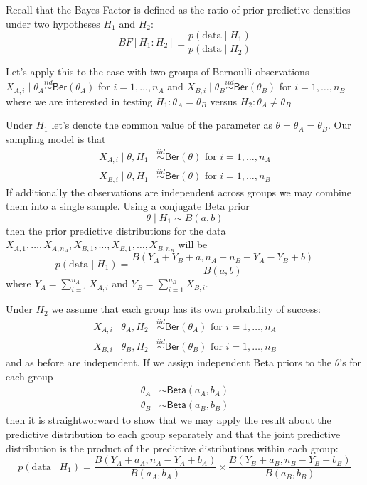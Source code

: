 \documentclass[11pt]{article}
\def\Ber{\textsf{Ber}}
\def\iid{\stackrel{iid}{\sim}}
\newcommand{\Beta}{\textsf{Beta}}
\def\BF{\textit{BF}}
\def\data{\text{data}}
\begin{document}
Recall that the Bayes Factor is defined as the ratio of prior predictive densities under two hypotheses $H_1$ and $H_2$:
$$
\BF[H_1:H_2] \equiv \frac{p(\data \mid H_1)}{ p(\data \mid H_2)}
$$

Let's apply this to the case with two groups of Bernoulli observations $X_{A,i} \mid \theta_A \iid \Ber(\theta_A)$ for $i = 1, \ldots, n_A$ and $X_{B,i} \mid \theta_B \iid \Ber(\theta_B)$ for $i = 1, \ldots, n_B$  where we are interested in testing $H_1: \theta_A = \theta_B$ versus $H_2: \theta_A \neq \theta_B$ 

Under $H_1$ let's denote the common value of the parameter as $\theta = \theta_A = \theta_B$.  Our sampling model is that 
 \begin{align*}
X_{A,i} \mid \theta, H_1 & \iid \Ber(\theta) \text{ for }i = 1, \ldots, n_A \\
X_{B,i} \mid \theta, H_1 & \iid \Ber(\theta)  \text{ for } i = 1, \ldots, n_B  
\end{align*}
If additionally the observations are independent across groups we may combine them into a single sample. Using a conjugate Beta prior 
$$\theta \mid H_1 \sim B(a, b)$$
then the prior predictive distributions for the data $X_{A,1}, \ldots, X_{A, n_A}, X_{B,1}, \ldots, X_{B, 1}, \ldots, X_{B, n_B}$ will be
$$p(\data \mid H_1) = \frac{B(Y_A + Y_B + a, n_A + n_B - Y_A - Y_B + b)}{B(a,b)}
$$
where $Y_A = \sum_{i = 1}^{n_A} X_{A,i}$ and $Y_B = \sum_{i = 1}^{n_B}X_{B, i}$.

Under $H_2$ we assume that each group has its own probability of success:
\begin{align*}
X_{A,i}  \mid \theta_A, H_2 & \iid \Ber(\theta_A) \text{ for }i = 1, \ldots, n_A \\
X_{B,i}  \mid \theta_B, H_2 & \iid \Ber(\theta_B)  \text{ for } i = 1, \ldots, n_B  
\end{align*}
and as before are independent.  If we assign independent Beta priors to the $\theta$'s  for each group
\begin{align*}
\theta_A & \sim \Beta(a_A, b_A) \\
\theta_B & \sim \Beta(a_B, b_B)
\end{align*}
then it is straightworward to show that we may apply the result about the predictive distribution to each group separately and that the joint predictive distribution is the product of the predictive distributions within each group:
$$p(\data \mid H_1) = \frac{B(Y_A + a_A, n_A - Y_A  + b_A)} {B(a_A,b_A)}\times 
\frac{B(Y_B + a_B, n_B - Y_B  + b_B)} {B(a_B,b_B)}
$$
\end{document}
